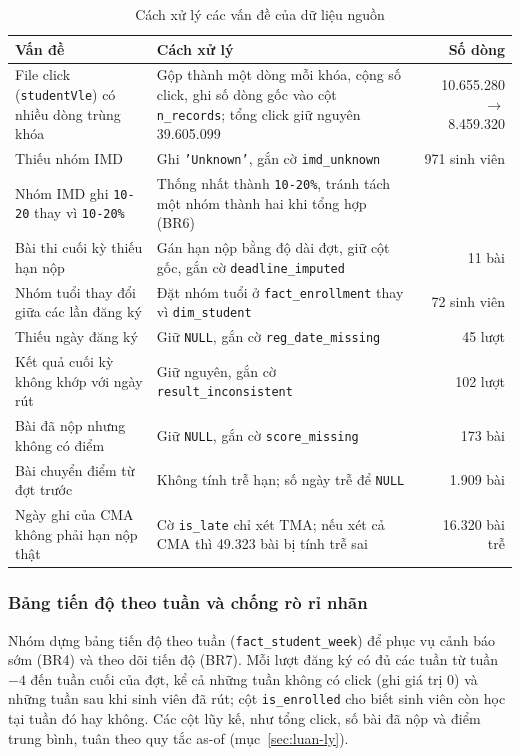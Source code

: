 \begin{table}[htbp]
\centering
\footnotesize
\begin{tabularx}{\textwidth}{|p{4.0cm}|X|r|}
\hline
\textbf{Vấn đề} & \textbf{Cách xử lý} & \textbf{Số dòng} \\ \hline
File click (\texttt{studentVle}) có nhiều dòng trùng khóa & Gộp thành một dòng mỗi khóa, cộng số click, ghi số dòng gốc vào cột \texttt{n\_records}; tổng click giữ nguyên 39.605.099 & 10.655.280 $\rightarrow$ 8.459.320 \\ \hline
Thiếu nhóm IMD & Ghi \texttt{'Unknown'}, gắn cờ \texttt{imd\_unknown} & 971 sinh viên \\ \hline
Nhóm IMD ghi \texttt{10-20} thay vì \texttt{10-20\%} & Thống nhất thành \texttt{10-20\%}, tránh tách một nhóm thành hai khi tổng hợp (BR6) & \\ \hline
Bài thi cuối kỳ thiếu hạn nộp & Gán hạn nộp bằng độ dài đợt, giữ cột gốc, gắn cờ \texttt{deadline\_imputed} & 11 bài \\ \hline
Nhóm tuổi thay đổi giữa các lần đăng ký & Đặt nhóm tuổi ở \texttt{fact\_enrollment} thay vì \texttt{dim\_student} & 72 sinh viên \\ \hline
Thiếu ngày đăng ký & Giữ \texttt{NULL}, gắn cờ \texttt{reg\_date\_missing} & 45 lượt \\ \hline
Kết quả cuối kỳ không khớp với ngày rút & Giữ nguyên, gắn cờ \texttt{result\_inconsistent} & 102 lượt \\ \hline
Bài đã nộp nhưng không có điểm & Giữ \texttt{NULL}, gắn cờ \texttt{score\_missing} & 173 bài \\ \hline
Bài chuyển điểm từ đợt trước & Không tính trễ hạn; số ngày trễ để \texttt{NULL} & 1.909 bài \\ \hline
Ngày ghi của CMA không phải hạn nộp thật & Cờ \texttt{is\_late} chỉ xét TMA; nếu xét cả CMA thì 49.323 bài bị tính trễ sai & 16.320 bài trễ \\ \hline
\end{tabularx}
\caption{Cách xử lý các vấn đề của dữ liệu nguồn}
\label{tab:xu-ly}
\end{table}

\subsubsection{Bảng tiến độ theo tuần và chống rò rỉ nhãn}
\label{sec:tien-do-tuan}

Nhóm dựng bảng tiến độ theo tuần (\texttt{fact\_student\_week}) để phục vụ cảnh báo sớm (BR4)
và theo dõi tiến độ (BR7). Mỗi lượt đăng ký có đủ các tuần từ tuần $-4$
đến tuần cuối của đợt, kể cả những tuần không có click (ghi giá trị 0) và những tuần sau khi
sinh viên đã rút; cột \texttt{is\_enrolled} cho biết sinh viên còn học tại tuần đó hay không.
Các cột lũy kế, như tổng click, số bài đã nộp và điểm trung bình, tuân theo quy tắc as-of
(mục~\ref{sec:luan-ly}).

